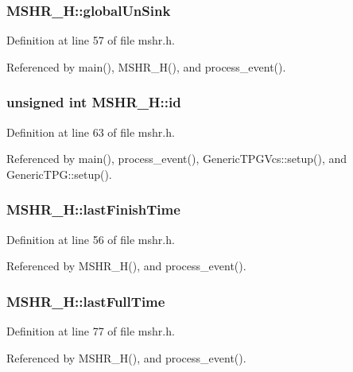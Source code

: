 \subsubsection[{globalUnSink}]{ {\bf MSHR\_\-H::globalUnSink}}\label{classMSHR__H_08f7e602a70bcf8d0e991d46e19265a2}




Definition at line 57 of file mshr.h.

Referenced by main(), MSHR\_\-H(), and process\_\-event().
\subsubsection[{id}]{\setlength{\rightskip}{0pt plus 5cm}unsigned int {\bf MSHR\_\-H::id}}\label{classMSHR__H_97b745c7aeca64268c19411dd6ba5354}




Definition at line 63 of file mshr.h.

Referenced by main(), process\_\-event(), GenericTPGVcs::setup(), and GenericTPG::setup().
\subsubsection[{lastFinishTime}]{ {\bf MSHR\_\-H::lastFinishTime}}\label{classMSHR__H_adfd06c0a14ec47c72e3b3e0c436d62e}




Definition at line 56 of file mshr.h.

Referenced by MSHR\_\-H(), and process\_\-event().
\subsubsection[{lastFullTime}]{ {\bf MSHR\_\-H::lastFullTime}}\label{classMSHR__H_d00d664b7b00f6778cb5ec4ed33b8ca6}




Definition at line 77 of file mshr.h.

Referenced by MSHR\_\-H(), and process\_\-event().
